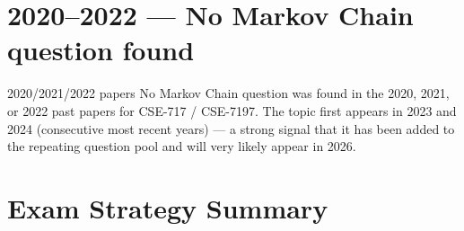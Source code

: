 \documentclass[12pt,a4paper]{article}
\begin{document}
\section*{2020--2022 --- No Markov Chain question found}

\begin{warnbox}{2020/2021/2022 papers}
No Markov Chain question was found in the 2020, 2021, or 2022 past papers for CSE-717 / CSE-7197. The topic first appears in 2023 and 2024 (consecutive most recent years) --- a strong signal that it has been added to the repeating question pool and will very likely appear in 2026.
\end{warnbox}

\section*{Exam Strategy Summary}
\end{document}
